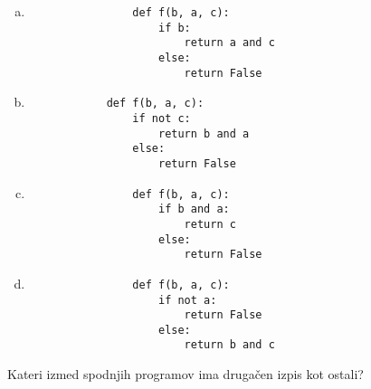 \documentclass[arhiv, 10pt]{../izpit}
\begin{document}
        \begin{multicols}{2}
        \begin{enumerate}[(a)]
\item 
                \begin{verbatim}
                def f(b, a, c):
                    if b:
                        return a and c
                    else:
                        return False
                \end{verbatim}
            
\item 
            \begin{verbatim}
            def f(b, a, c):
                if not c:
                    return b and a
                else:
                    return False
            \end{verbatim}
        
\item 
                \begin{verbatim}
                def f(b, a, c):
                    if b and a:
                        return c
                    else:
                        return False
                \end{verbatim}
            
\item 
                \begin{verbatim}
                def f(b, a, c):
                    if not a:
                        return False
                    else:
                        return b and c
                \end{verbatim}
            
\end{enumerate}

        \end{multicols}
    
        \naloga*
        
        Kateri izmed spodnjih programov ima drugačen izpis kot ostali?
    
\end{document}
